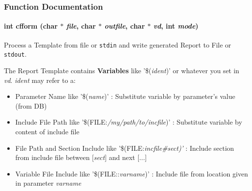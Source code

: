 \subsubsection{Function Documentation}
\hypertarget{group__report__generation_g2f8350e7d032c87b2a0e1cb6149a85ec}{
\paragraph[{cfform}]{\setlength{\rightskip}{0pt plus 5cm}int cfform (char $\ast$ {\em file}, \/  char $\ast$ {\em outfile}, \/  char $\ast$ {\em vd}, \/  int {\em mode})}\hfill}
\label{group__report__generation_g2f8350e7d032c87b2a0e1cb6149a85ec}


Process a Template from file or {\tt stdin} and write generated Report to File or {\tt stdout}. 

The Report Template contains {\bf Variables} like '\$({\em ident\/})' or whatever you set in {\em vd\/}. {\em ident\/} may refer to a:

\begin{itemize}
\item Parameter Name like '\$({\em name\/})' : Substitute variable by parameter's value (from DB)\item Include File Path like '\$(FILE:{\em /my/path/to/incfile\/})' : Substitute variable by content of include file\item File Path and Section Include like '\$(FILE:{\em incfile\#{\em sect\/})'\/} : Include section from include file between \mbox{[}{\em sect\/}\mbox{]} and next \mbox{[}{\em \/}...\mbox{]}\item Variable File Include like '\$(FILE::{\em varname\/})' : Include file from location given in parameter {\em varname\/} \end{itemize}



